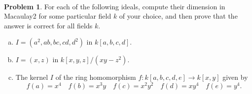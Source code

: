 \documentclass[11pt]{article}
\theoremstyle{definition}
\newtheorem{problem}{Problem}
\begin{document}
\

\begin{problem}
	For each of the following ideals, compute their dimension in Macaulay2 for some particular field $k$ of your choice, and then prove that the answer is correct for all fields $k$.

\begin{enumerate}[a)]
\item $I = (a^2,ab,bc,cd,d^2)$ in $k[a,b,c,d]$.
\item $I = (x,z)$ in $k[x,y,z]/(xy-z^2)$.
\item The kernel $I$ of the ring homomorphism $f\!: k[a,b,c,d,e] \to k[x,y]$ given by
$$f(a) = x^4 \quad f(b) = x^3y \quad f(c) = x^2y^2 \quad f(d) = xy^4 \quad f(e) = y^4.$$
\end{enumerate}

\end{problem}
\end{document}
